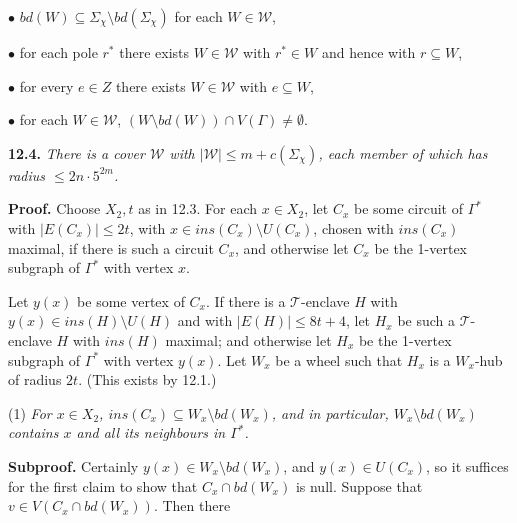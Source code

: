 \hspace*{12pt}$\bullet$ $bd(W) \subseteq \Sigma_\chi \setminus bd(\Sigma_\chi)$ for each $W \in \mathscr{W}$,

\hspace*{12pt}$\bullet$ for each pole $r^*$ there exists $W \in \mathscr{W}$ with $r^* \in W$ and hence with $r \subseteq W$,

\hspace*{12pt}$\bullet$ for every $e \in Z$ there exists $W \in \mathscr{W}$ with $e \subseteq W$,

\hspace*{12pt}$\bullet$ for each $W \in \mathscr{W}$, $(W \setminus bd(W)) \cap V(\Gamma) \ne \emptyset$.

\textbf{12.4.} \textit{There is a cover $\mathscr{W}$ with $|\mathscr{W}| \le m + c(\Sigma_\chi)$, each member of which has radius $\le 2n \cdot 5^{2m}$.}

\textbf{Proof.} Choose $X_2, t$ as in 12.3. For each $x \in X_2$, let $C_x$ be some circuit of $\Gamma^*$ with $|E(C_x)| \le 2t$, with $x \in ins(C_x) \setminus U(C_x)$, chosen with $ins(C_x)$ maximal, if there is such a circuit $C_x$, and otherwise let $C_x$ be the 1-vertex subgraph of $\Gamma^*$ with vertex $x$.

Let $y(x)$ be some vertex of $C_x$. If there is a $\mathscr{T}$-enclave $H$ with $y(x) \in ins(H) \setminus U(H)$ and with $|E(H)| \le 8t + 4$, let $H_x$ be such a $\mathscr{T}$-enclave $H$ with $ins(H)$ maximal; and otherwise let $H_x$ be the 1-vertex subgraph of $\Gamma^*$ with vertex $y(x)$. Let $W_x$ be a wheel such that $H_x$ is a $W_x$-hub of radius $2t$. (This exists by 12.1.)

\hspace*{12pt}(1) \textit{For $x \in X_2$, $ins(C_x) \subseteq W_x \setminus bd(W_x)$, and in particular, $W_x \setminus bd(W_x)$ contains $x$ and all its neighbours in $\Gamma^*$.}

\textbf{Subproof.} Certainly $y(x) \in W_x \setminus bd(W_x)$, and $y(x) \in U(C_x)$, so it suffices for the first claim to show that $C_x \cap bd(W_x)$ is null. Suppose that $v \in V(C_x \cap bd(W_x))$. Then there
